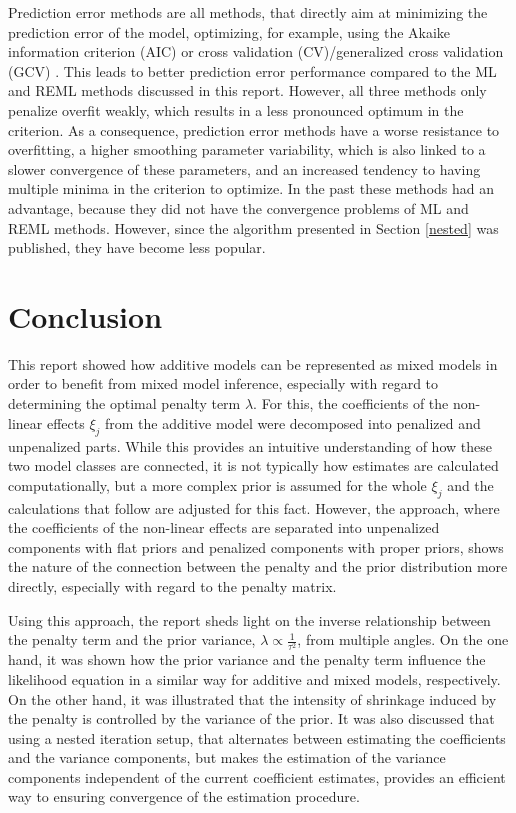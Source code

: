 \documentclass[12pt]{article}
\begin{document}
Prediction error methods are all methods, that directly aim at minimizing the prediction error of the model, optimizing, for example, using the Akaike information criterion (AIC) or cross validation (CV)/generalized cross validation (GCV) \cite{wood2011fast}. This leads to better prediction error performance compared to the ML and REML methods discussed in this report. However, all three methods only penalize overfit weakly, which results in a less pronounced optimum in the criterion. As a consequence, prediction error methods have a worse resistance to overfitting, a higher smoothing parameter variability, which is also linked to a slower convergence of these parameters, and an increased tendency to having multiple minima in the criterion to optimize. In the past these methods had an advantage, because they did not have the convergence problems of ML and REML methods. However, since the algorithm presented in Section \ref{nested} was published, they have become less popular.


\section{Conclusion} %

This report showed how additive models can be represented as mixed models in order to benefit from mixed model inference, especially with regard to determining the optimal penalty term $\hat{\lambda}$. 
For this, the coefficients of the non-linear effects $\xi_j$ from the additive model were decomposed into penalized and unpenalized parts. While this provides an intuitive understanding of how these two model classes are 
connected, it is not typically how estimates are calculated computationally, but a more complex prior is assumed for the whole $\xi_j$ and the calculations that follow are adjusted for this fact. However, the approach, where the coefficients of the non-linear effects are separated into unpenalized components with flat priors and penalized components with proper priors, shows the nature of the connection between the penalty and the prior distribution more directly, especially with regard to the penalty matrix.

Using this approach, the report sheds light on the inverse relationship between the penalty term and the prior variance, $\lambda \propto \frac{1}{\tau^2}$, from multiple angles. On the one hand, it was shown how the prior variance and the penalty term influence the likelihood equation in a similar way for additive and mixed models, respectively. On the other hand, it was illustrated that the intensity of shrinkage induced by the penalty is controlled by the variance of the prior. It was also discussed that using a nested iteration setup, that alternates between estimating the coefficients and the variance components, but makes the estimation of the variance components independent of the current coefficient estimates, provides an efficient way to ensuring convergence of the estimation procedure.
\end{document}
